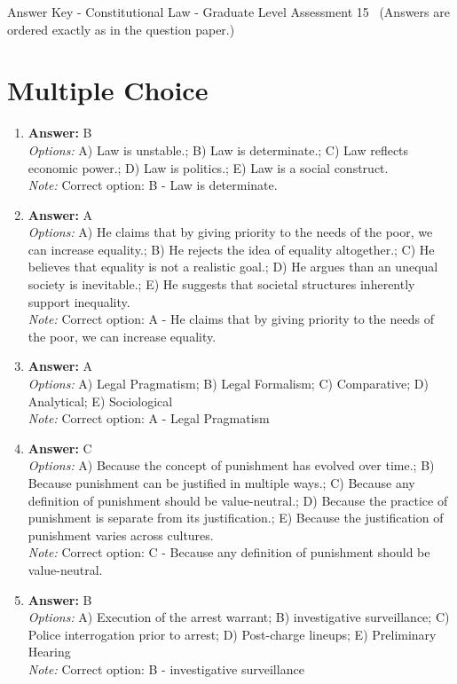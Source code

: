 \documentclass[12pt]{article}
\begin{document}
\begin{center}
Answer Key - Constitutional Law - Graduate Level Assessment 15 \
\small (Answers are ordered exactly as in the question paper.)
\end{center}

\section*{Multiple Choice}
\begin{enumerate}[label=\arabic*.]
\item \textbf{Answer:} B
\\ \textit{Options:} A) Law is unstable.; B) Law is determinate.; C) Law reflects economic power.; D) Law is politics.; E) Law is a social construct.
\\ \textit{Note:} Correct option: B - Law is determinate.
\item \textbf{Answer:} A
\\ \textit{Options:} A) He claims that by giving priority to the needs of the poor, we can increase equality.; B) He rejects the idea of equality altogether.; C) He believes that equality is not a realistic goal.; D) He argues than an unequal society is inevitable.; E) He suggests that societal structures inherently support inequality.
\\ \textit{Note:} Correct option: A - He claims that by giving priority to the needs of the poor, we can increase equality.
\item \textbf{Answer:} A
\\ \textit{Options:} A) Legal Pragmatism; B) Legal Formalism; C) Comparative; D) Analytical; E) Sociological
\\ \textit{Note:} Correct option: A - Legal Pragmatism
\item \textbf{Answer:} C
\\ \textit{Options:} A) Because the concept of punishment has evolved over time.; B) Because punishment can be justified in multiple ways.; C) Because any definition of punishment should be value-neutral.; D) Because the practice of punishment is separate from its justification.; E) Because the justification of punishment varies across cultures.
\\ \textit{Note:} Correct option: C - Because any definition of punishment should be value-neutral.
\item \textbf{Answer:} B
\\ \textit{Options:} A) Execution of the arrest warrant; B) investigative surveillance; C) Police interrogation prior to arrest; D) Post-charge lineups; E) Preliminary Hearing
\\ \textit{Note:} Correct option: B - investigative surveillance
\end{enumerate}
\end{document}
